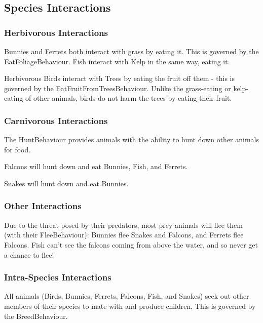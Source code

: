 \documentclass{article}
\begin{document}
\begin{multicols}{2}
        \subsection{Species Interactions}

            \subsubsection{Herbivorous Interactions}
            
            Bunnies and Ferrets both interact with grass by eating it. This is governed by the EatFoliageBehaviour. Fish interact with Kelp in the same way, eating it.
            
            Herbivorous Birds interact with Trees by eating the fruit off them - this is governed by the EatFruitFromTreesBehaviour. Unlike the grass-eating or kelp-eating of other animals, birds do not harm the trees by eating their fruit.
            
            \subsubsection{Carnivorous Interactions}
            
            The HuntBehaviour provides animals with the ability to hunt down other animals for food.
            
            Falcons will hunt down and eat Bunnies, Fish, and Ferrets.
            
            Snakes will hunt down and eat Bunnies.
            
            \subsubsection{Other Interactions}
            
            Due to the threat posed by their predators, most prey animals will flee them (with their FleeBehaviour): Bunnies flee Snakes and Falcons, and Ferrets flee Falcons. Fish can't see the falcons coming from above the water, and so never get a chance to flee!
            
            \subsubsection{Intra-Species Interactions}
            
            All animals (Birds, Bunnies, Ferrets, Falcons, Fish, and Snakes) seek out other members of their species to mate with and produce children. This is governed by the BreedBehaviour.
        

\end{multicols}
\end{document}
